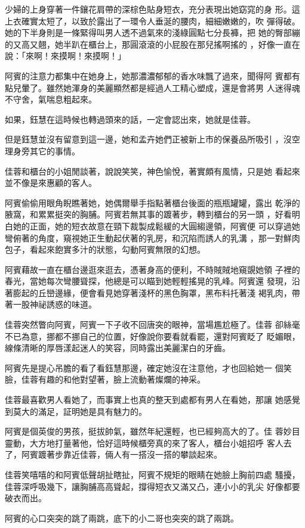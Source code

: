 少婦的上身穿著一件鑲花肩帶的深棕色貼身短衣，充分表現出她窈窕的身
形。這上衣確實太短了，以致於露出了一環令人垂涎的腰肉，細細嫩嫩的，吹
彈得破。她的下半身則是一條緊得叫男人透不過氣來的淺綠圓點七分長褲，把
她的臀部繃的又高又翹，她半趴在櫃台上，那圓滾滾的小屁股在那兒搖啊搖的
，好像一直在說：「來啊！來摸啊！來摸啊！」

阿賓的注意力都集中在她身上，她那濃濃郁郁的香水味飄了過來，聞得阿
賓都有點兒暈了。雖然她渾身的美麗顯然都是經過人工精心塑成，還是會將男
人迷得魂不守舍，氣喘息粗起來。

如果，鈺慧在這時候也轉過頭來的話，一定會認出來，她就是佳蓉。

但是鈺慧並沒有留意到這一邊，她和孟卉她們正被新上市的保養品所吸引
，沒空理身旁其它的事情。

佳蓉和櫃台的小姐閒談著，說說笑笑，神色愉悅，著實頗有風情，只是她
看起來並不像是來惠顧的客人。

阿賓偷偷用眼角睨瞧著她，她偶爾舉手指點著櫃台後面的瓶瓶罐罐，露出
乾淨的腋窩，和累累挺突的胸脯。阿賓若無其事的踱著步，轉到櫃台的另一頭
，好看明白她的正面，她的短衣故意在頸下裁製成鬆緩的大圓縐邊領，阿賓便
可以穿過她彎俯著的角度，窺視她正生動起伏著的乳房，和沉陷而誘人的乳溝
，那一對鮮肉包子，看起來飽實多汁的狀態，勾動阿賓無限的幻想。

阿賓藉故一直在櫃台邊逛來逛去，憑著身高的便利，不時賊賊地窺覬她領
子裡的春光，當她每次彎腰聳探，他總是可以瞄到她輕輕搖晃的乳峰。阿賓還
發現，沿著膨起的丘巒邊緣，便會看見她穿著淺杯的黑色胸罩，黑布料托著淺
褐乳肉，帶著一股神祕誘惑的味道。

佳蓉突然瞥向阿賓，阿賓一下子收不回唐突的眼神，當場尷尬極了。佳蓉
卻絲毫不已為意，挪都不挪自己的位置，好像說你要看就看罷，還對阿賓眨了
眨媚眼，線條清晰的厚唇漾起迷人的笑容，同時露出美麗潔白的牙齒。

阿賓先是提心吊膽的看了看鈺慧那邊，確定她沒在注意他，才也回給她一
個笑臉，佳蓉有趣的和他對望著，臉上流動著燦爛的神采。

佳蓉最喜歡男人看她了，而事實上也真的整天到處都有男人在看她，那讓
她感覺到莫大的滿足，証明她是具有魅力的。

阿賓是個英俊的男孩，挺拔帥氣，雖然年紀還輕，也已經夠高大的了。佳
蓉妙目靈動，大方地打量著他，恰好這時候櫃旁真的來了客人，櫃台小姐招呼
客人去了，阿賓踱著步靠近佳蓉，倆人有一搭沒一搭的攀談起來。

佳蓉笑嘻嘻的和阿賓低聲胡扯瞎扯，阿賓不規矩的眼睛在她臉上胸前四處
騷擾，佳蓉深呼吸幾下，讓胸脯高高聳起，撐得短衣又滿又凸，連小小的乳尖
好像都要破衣而出。

阿賓的心口突突的跳了兩跳，底下的小二哥也突突的跳了兩跳。

